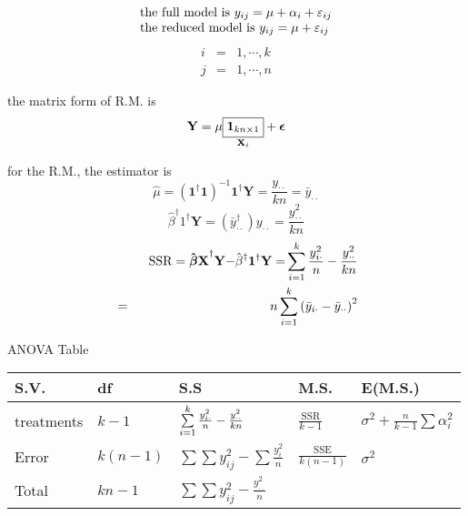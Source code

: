\documentclass{article}
\begin{document}
\begin{equation*}
\begin{tabular}{l}
the full model is $y_{ij}=\mu +\alpha _{i}+\varepsilon _{ij}$ \\ 
the reduced model is $y_{ij}=\mu +\varepsilon _{ij}$%
\end{tabular}%
\end{equation*}%
\begin{eqnarray*}
i &=&1,\cdots ,k \\
j &=&1,\cdots ,n
\end{eqnarray*}

\bigskip

the matrix form of R.M. is%
\begin{equation*}
\mathbf{Y}=\mu \underset{\mathbf{X}_{i}}{\fbox{$\mathbf{1}_{kn\times 1}$}}+%
\mathbf{\epsilon }
\end{equation*}

for the R.M., the estimator is%
\begin{equation*}
\hat{\mu}=\left( \mathbf{1}^{\dagger }\mathbf{1}\right) ^{-1}\mathbf{1}%
^{\dagger }\mathbf{Y}=\frac{y_{\cdot \cdot }}{kn}=\bar{y}_{\cdot \cdot }
\end{equation*}%
\begin{equation*}
\hat{\beta}^{\dagger }1^{\dagger }\mathbf{Y=}\left( \bar{y}_{\cdot \cdot
}^{\dagger }\right) y_{\cdot \cdot }=\frac{y_{\cdot \cdot }^{2}}{kn}
\end{equation*}%
\begin{eqnarray*}
&\therefore &\text{SSR}=\mathbf{\hat{\beta}X}^{\dagger }\mathbf{Y-}\hat{\beta%
}^{\dagger }\mathbf{1}^{\dagger }\mathbf{Y=}\sum\limits_{i=1}^{k}\frac{%
y_{i\cdot }^{2}}{n}-\frac{y_{\cdot \cdot }^{2}}{kn} \\
&=&n\sum\limits_{i=1}^{k}\left( \bar{y}_{i\cdot }-\bar{y}_{\cdot \cdot
}\right) ^{2}
\end{eqnarray*}

\bigskip

ANOVA Table

\bigskip

\begin{tabular}{lllll}
S.V. & df & S.S & M.S. & E(M.S.) \\ \hline
treatments & $k-1$ & $\sum\limits_{i=1}^{k}\frac{y_{i\cdot }^{2}}{n}-\frac{%
y_{\cdot \cdot }^{2}}{kn}$ & $\frac{\text{SSR}}{k-1}$ & $\sigma ^{2}+\frac{n%
}{k-1}\sum \alpha _{i}^{2}$ \\ 
Error & $k\left( n-1\right) $ & $\sum \sum y_{ij}^{2}-\sum \frac{y_{i}^{2}}{n%
}$ & $\frac{\text{SSE}}{k\left( n-1\right) }$ & $\sigma ^{2}$ \\ 
Total & $kn-1$ & $\sum \sum y_{ij}^{2}-\frac{y_{\cdot \cdot }^{2}}{n}$ &  & 
\end{tabular}
\end{document}
